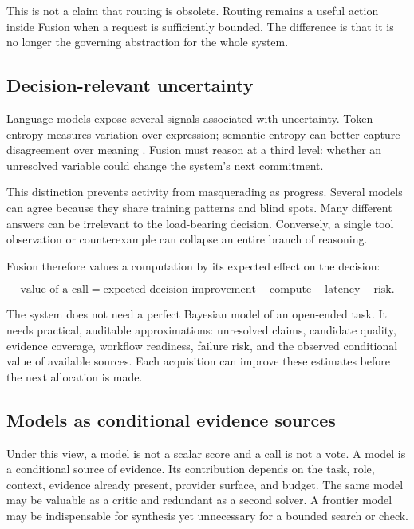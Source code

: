 This is not a claim that routing is obsolete. Routing remains a useful action
inside Fusion when a request is sufficiently bounded. The difference is that
it is no longer the governing abstraction for the whole system.

\subsection{Decision-relevant uncertainty}

Language models expose several signals associated with uncertainty. Token
entropy measures variation over expression; semantic entropy can better capture
disagreement over meaning
\citep{kuhn2023semantic,farquhar2024semantic}. Fusion must reason at a third
level: whether an unresolved variable could change the system's next
commitment.

This distinction prevents activity from masquerading as progress. Several
models can agree because they share training patterns and blind spots. Many
different answers can be irrelevant to the load-bearing decision. Conversely,
a single tool observation or counterexample can collapse an entire branch of
reasoning.

Fusion therefore values a computation by its expected effect on the decision:

\begin{equation}
  \text{value of a call}
  = \text{expected decision improvement}
  - \text{compute} - \text{latency} - \text{risk}.
\end{equation}

The system does not need a perfect Bayesian model of an open-ended task. It
needs practical, auditable approximations: unresolved claims, candidate
quality, evidence coverage, workflow readiness, failure risk, and the observed
conditional value of available sources. Each acquisition can improve these
estimates before the next allocation is made.

\subsection{Models as conditional evidence sources}

Under this view, a model is not a scalar score and a call is not a vote. A model
is a conditional source of evidence. Its contribution depends on the task,
role, context, evidence already present, provider surface, and budget. The same
model may be valuable as a critic and redundant as a second solver. A frontier
model may be indispensable for synthesis yet unnecessary for a bounded search
or check.

